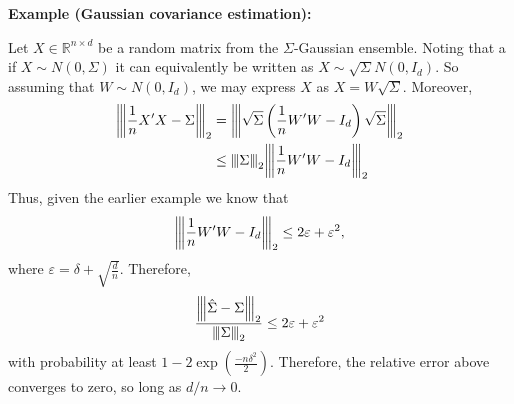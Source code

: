 \documentclass[10pt,handout,english]{beamer}
\newcommand{\R}{\mathbb{R}}
\newcommand{\vertiii}[1]{{\left\vert\kern-0.25ex\left\vert\kern-0.25ex\left\vert #1 
    \right\vert\kern-0.25ex\right\vert\kern-0.25ex\right\vert}}
\begin{document}
\begin{frame}[allowframebreaks]
\textbf{Example (Gaussian covariance estimation):} 

Let $X\in\R^{n\times d}$ be a random matrix from the $\Sigma$-Gaussian ensemble. Noting that a if $X\sim N(0,\Sigma)$ it can equivalently be written as $X\sim\sqrt{\Sigma} N(0,I_d)$. So assuming that $W\sim N(0,I_d)$, we may express $X$ as $X=W\sqrt{\Sigma}$. Moreover, 
\begin{align*}
\vertiii{\frac{1}{n}X'X-\Sigma}_2&=\vertiii{\sqrt{\Sigma}\left(\frac{1}{n}W'W-I_d\right)\sqrt{\Sigma}}_2\\
&\leq\vertiii{\Sigma}_2\vertiii{\frac{1}{n}W'W-I_d}_2
\end{align*}
Thus, given the earlier example we know that
\[
\vertiii{\frac{1}{n}W'W-I_d}_2\leq2\varepsilon+\varepsilon^2,
\]
where $\varepsilon=\delta+\sqrt{\frac{d}{n}}$. Therefore, 
\[
\frac{\vertiii{\hat{\Sigma}-\Sigma}_2}{\vertiii{\Sigma}_2}\leq 2\varepsilon+\varepsilon^2
\]
with probability at least $1-2\exp{\left(\frac{-n\delta^2}{2}\right)}$. Therefore, the relative error above converges to zero, so long as $d/n\to 0$.
\end{frame}
\end{document}

